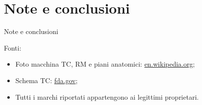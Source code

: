 \documentclass{beamer}
\begin{document}
	
	\section{Note e conclusioni}
	\begin{frame}{Note e conclusioni}
	
	Fonti:
	\begin{itemize}
		\item Foto macchina TC, RM e piani anatomici: \href{https://en.wikipedia.org/wiki/Main_Page}{en.wikipedia.org};
		\item Schema TC: \href{https://www.fda.gov/radiation-emitting-products/medical-x-ray-imaging/what-computed-tomography}{fda.gov};
		\item Tutti i marchi riportati appartengono ai legittimi proprietari.
	\end{itemize}		
	
	\end{frame}
	
\end{document}
